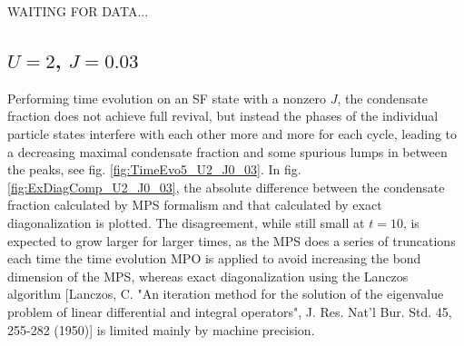 WAITING FOR DATA...

\subsection{$U=2$, $J=0.03$}
Performing time evolution on an SF state with a nonzero $J$, the condensate fraction does not achieve full revival, but instead the phases of the individual particle states interfere with each other more and more for each cycle, leading to a decreasing maximal condensate fraction and some spurious lumps in between the peaks, see fig. \ref{fig:TimeEvo5_U2_J0_03}. In fig. \ref{fig:ExDiagComp_U2_J0_03}, the absolute difference between the condensate fraction calculated by MPS formalism and that calculated by exact diagonalization is plotted. The disagreement, while still small at $t=10$, is expected to grow larger for larger times, as the MPS does a series of truncations each time the time evolution MPO is applied to avoid increasing the bond dimension of the MPS, whereas exact diagonalization using the Lanczos algorithm [Lanczos, C. "An iteration method for the solution of the eigenvalue problem of linear differential and integral operators", J. Res. Nat’l Bur. Std. 45, 255-282 (1950)] is limited mainly by machine precision.


